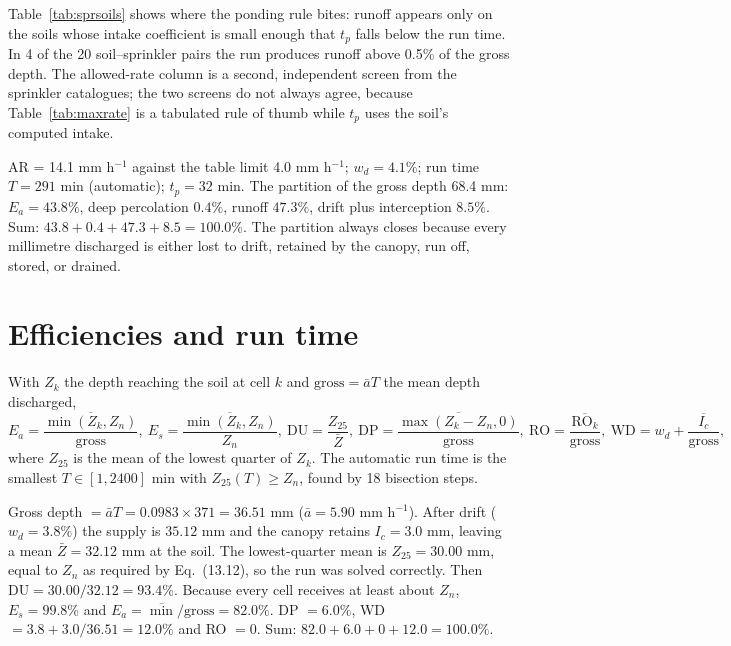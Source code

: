 \begin{keybox}
Table~\ref{tab:sprsoils} shows where the ponding rule bites: runoff appears only on the soils whose intake coefficient is small enough that $t_p$ falls below the run time. In 4 of the 20 soil--sprinkler pairs the run produces runoff above 0.5\% of the gross depth. The allowed-rate column is a second, independent screen from the sprinkler catalogues; the two screens do not always agree, because Table~\ref{tab:maxrate} is a tabulated rule of thumb while $t_p$ uses the soil's computed intake.
\end{keybox}
\sol  AR = 14.1 mm h$^{-1}$ against the table limit 4.0 mm h$^{-1}$; $w_d=4.1\%$; run time $T=291$ min (automatic); $t_p=32$ min. The partition of the gross depth 68.4 mm: $E_a=43.8\%$, deep percolation $0.4\%$, runoff $47.3\%$, drift plus interception $8.5\%$. Sum: $43.8+0.4+47.3+8.5=100.0\%$. The partition always closes because every millimetre discharged is either lost to drift, retained by the canopy, run off, stored, or drained.


\section{Efficiencies and run time}
With $Z_k$ the depth reaching the soil at cell $k$ and $\mathrm{gross}=\bar aT$ the mean depth discharged,
\begin{equation}E_a=\frac{\overline{\min(Z_k,Z_n)}}{\mathrm{gross}},\ E_s=\frac{\overline{\min(Z_k,Z_n)}}{Z_n},\ \mathrm{DU}=\frac{Z_{25}}{\bar Z},\ \mathrm{DP}=\frac{\overline{\max(Z_k-Z_n,0)}}{\mathrm{gross}},\ \mathrm{RO}=\frac{\overline{\mathrm{RO}_k}}{\mathrm{gross}},\ \mathrm{WD}=w_d+\frac{\overline{I_c}}{\mathrm{gross}},\end{equation}
where $Z_{25}$ is the mean of the lowest quarter of $Z_k$. The automatic run time is the smallest $T\in[1,2400]$ min with $Z_{25}(T)\ge Z_n$, found by 18 bisection steps.

\sol  Gross depth $=\bar aT=0.0983\times371=36.51$ mm ($\bar a=5.90$ mm h$^{-1}$). After drift ($w_d=3.8\%$) the supply is $35.12$ mm and the canopy retains $I_c=3.0$ mm, leaving a mean $\bar Z=32.12$ mm at the soil. The lowest-quarter mean is $Z_{25}=30.00$ mm, equal to $Z_n$ as required by Eq.~(13.12), so the run was solved correctly. Then $\mathrm{DU}=30.00/32.12=93.4\%$. Because every cell receives at least about $Z_n$, $E_s=99.8\%$ and $E_a=\overline{\min}/\mathrm{gross}=82.0\%$. DP $=6.0\%$, WD $=3.8+3.0/36.51=12.0\%$ and RO $=0$. Sum: $82.0+6.0+0+12.0=100.0\%$.


